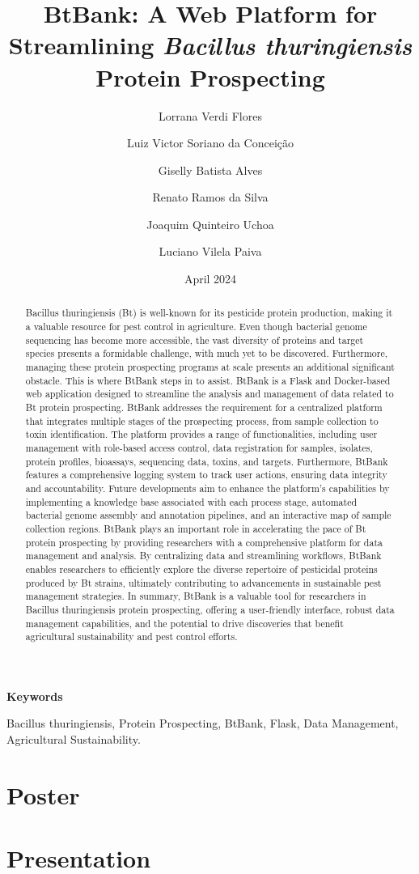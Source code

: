 \documentclass{article}
\title{BtBank: A Web Platform for Streamlining \textit{Bacillus thuringiensis} Protein Prospecting}
\author[1]{Lorrana Verdi Flores}
\author[2]{Luiz Victor Soriano da Conceição}
\author[3]{Giselly Batista Alves}
\author[4]{Renato Ramos da Silva}
\author[5]{Joaquim Quinteiro Uchoa}
\author[6]{Luciano Vilela Paiva}
\affil[1,2,3,4,5,6]{Universidade Federal de Lavras}
\date{April 2024}
\begin{document}
\maketitle
\begin{abstract}
Bacillus thuringiensis (Bt) is well-known for its pesticide protein production, making it a valuable resource for pest control in agriculture. Even though bacterial genome sequencing has become more accessible, the vast diversity of proteins and target species presents a formidable challenge, with much yet to be discovered. Furthermore, managing these protein prospecting programs at scale presents an additional significant obstacle. This is where BtBank steps in to assist. BtBank is a Flask and Docker-based web application designed to streamline the analysis and management of data related to Bt protein prospecting. BtBank addresses the requirement for a centralized platform that integrates multiple stages of the prospecting process, from sample collection to toxin identification. The platform provides a range of functionalities, including user management with role-based access control, data registration for samples, isolates, protein profiles, bioassays, sequencing data, toxins, and targets. Furthermore, BtBank features a comprehensive logging system to track user actions, ensuring data integrity and accountability. Future developments aim to enhance the platform's capabilities by implementing a knowledge base associated with each process stage, automated bacterial genome assembly and annotation pipelines, and an interactive map of sample collection regions. BtBank plays an important role in accelerating the pace of Bt protein prospecting by providing researchers with a comprehensive platform for data management and analysis. By centralizing data and streamlining workflows, BtBank enables researchers to efficiently explore the diverse repertoire of pesticidal proteins produced by Bt strains, ultimately contributing to advancements in sustainable pest management strategies. In summary, BtBank is a valuable tool for researchers in Bacillus thuringiensis protein prospecting, offering a user-friendly interface, robust data management capabilities, and the potential to drive discoveries that benefit agricultural sustainability and pest control efforts.

\end{abstract}

\textbf{Keywords}

Bacillus thuringiensis, Protein Prospecting, BtBank, Flask, Data Management, Agricultural Sustainability.

\section{Poster}


\section{Presentation}  

\end{document}
